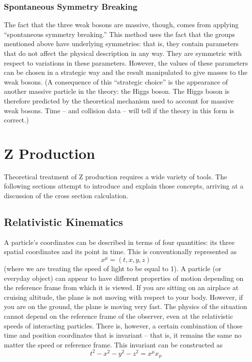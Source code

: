 \subsubsection{Spontaneous Symmetry Breaking}
The fact that the three weak bosons are massive, though, 
comes from applying ``spontaneous symmetry breaking.''  
This method uses the fact that the groups mentioned 
above have underlying symmetries: 
that is, they contain parameters that do not affect the 
physical description in any way.  
They are symmetric with respect to variations in these parameters.  
However, the values of these parameters can be chosen 
in a strategic way and the result manipulated %
to give masses to the weak bosons.  
(A consequence of this ``strategic choice'' is the appearance 
of another massive particle in the theory: 
the Higgs boson.  
The Higgs boson is therefore predicted by the theoretical 
mechanism used to account for massive weak bosons.  
Time -- and collision data -- will tell if the theory 
in this form is correct.)  


\section{Z Production}
\label{theory:Zprod}

Theoretical treatment of Z production 
requires a wide variety of tools.  
The following sections attempt to introduce 
and explain those concepts, 
arriving at a discussion of the 
cross section calculation.  

\subsection{Relativistic Kinematics}

A particle's coordinates can be described in terms of 
four quantities: its three spatial coordinates 
and its point in time.  This is conventionally 
represented as 
\[
x^{\mu} = (t, x, y, z)
\]
(where we are treating the speed of light to be 
equal to 1).  
A particle (or everyday object) can appear to 
have different properties of motion 
depending on the reference 
frame from which it is viewed.  
If you are sitting on an airplace at cruising altitude, 
the plane is not moving with respect to your body.  
However, if you are on the ground, the plane is 
moving very fast. %
The physics of the situation cannot depend on 
the reference frame of the observer, 
even at the relativistic speeds of interacting particles.  
There is, however, a certain combination 
of those time and position coordinates that is 
invariant -- that is, it remains the same no 
matter the speed or reference frame.  
This invariant can be constructed as 
\[
t^2 - x^2 - y^2 - z^2 = x^{\mu} x_{\mu}
\]

